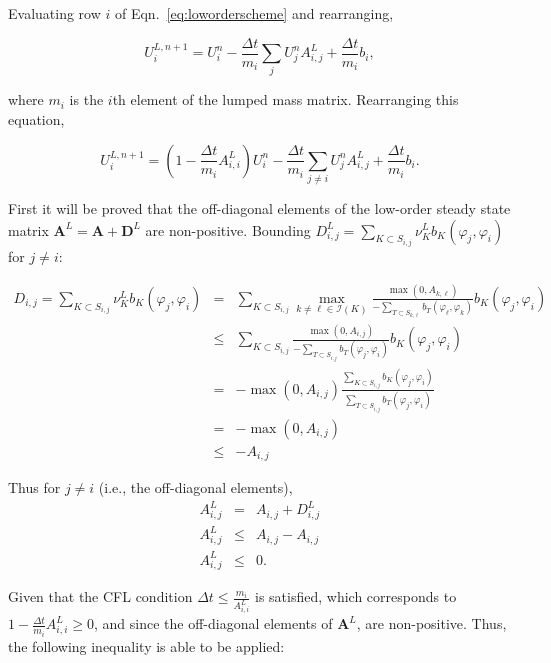 Evaluating row $i$ of Eqn.~\ref{eq:loworderscheme} and rearranging,

\[
   U_i^{L,n+1} = U_i^n - \frac{\Delta t}{m_i}\sum\limits_j U_j^n A^L_{i,j}
      + \frac{\Delta t}{m_i}b_i,
\]

\noindent
where $m_i$ is the $i$th element of the lumped mass matrix.
Rearranging this equation,

\[
   U_i^{L,n+1} = \left(1-\frac{\Delta t}{m_i}A^L_{i,i}\right)U_i^n - \frac{\Delta t}{m_i}
      \sum\limits_{j\ne i} U_j^n A^L_{i,j} + \frac{\Delta t}{m_i}b_i.
\]

\noindent
First it will be proved that the off-diagonal elements of the low-order steady
state matrix $\mathbf{A}^L = \mathbf{A} + \mathbf{D}^L$ are non-positive.
Bounding $D_{i,j}^L=\sum\limits_{K\subset S_{i,j}}\nu_K^L b_K(\varphi_j, \varphi_i)$
for $j \ne i$:

\begin{eqnarray*}
   D_{i,j}=\sum\limits_{K\subset S_{i,j}}\nu_K^L b_K(\varphi_j, \varphi_i)
   & = & \sum\limits_{K\subset S_{i,j}} \max\limits_{k\ne \ell\in \mathcal{I}(K)}
      \frac{\max(0,A_{k,\ell})}
		{-\sum\limits_{T\subset S_{k,\ell}} b_T(\varphi_{\ell}, \varphi_k)}
      b_K(\varphi_j,\varphi_i)\\
   & \le & \sum\limits_{K\subset S_{i,j}} \frac{\max(0,A_{i,j})}
		{-\sum\limits_{T\subset S_{i,j}} b_T(\varphi_j, \varphi_i)}b_K(\varphi_j,\varphi_i)\\
   & =   & -\max(0,A_{i,j}) \frac{\sum\limits_{K\subset S_{i,j}}
      b_K(\varphi_j,\varphi_i)}
		{\sum\limits_{T\subset S_{i,j}} b_T(\varphi_j, \varphi_i)}\\   
   & = & -\max(0,A_{i,j})\\
   & \le & -A_{i,j}
\end{eqnarray*}

\noindent
Thus for $j \ne i$ (i.e., the off-diagonal elements), 
\begin{eqnarray*}
	A^L_{i,j} & = & A_{i,j} + D_{i,j}^L\\
   A^L_{i,j} & \le & A_{i,j} - A_{i,j}\\
   A^L_{i,j} & \le & 0.
\end{eqnarray*}

\noindent
Given that the CFL condition $\Delta t \leq \frac{m_i}{A_{i,i}^L}$ is satisfied,
which corresponds to $1-\frac{\Delta t}{m_i}A^L_{i,i} \ge 0$, and since the off-diagonal
elements of $\mathbf{A}^L$, are non-positive. Thus, the following inequality is
able to be applied:

